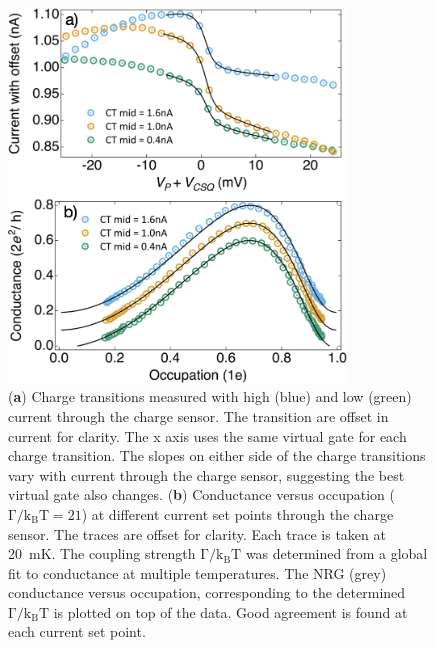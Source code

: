 \begin{figure}[!bht]
 \begin{center}
 \includegraphics[width=0.8\textwidth]{figures/ch3/crop_FiguresMaster.017.png}
 \caption[Conductance vs. Occupation : Varying the current through the charge sensor]{\label{fig:ch3/cond_occ_QPC_vs_ct} 
 (\textbf{a}) Charge transitions measured with high (blue) and low (green) current through the charge sensor. The transition are offset in current for clarity. The x axis uses the same virtual gate for each charge transition. The slopes on either side of the charge transitions vary with current through the charge sensor, suggesting the best virtual gate also changes. (\textbf{b}) Conductance versus occupation ($\mathrm{\Gamma/k_BT=21}$) at different current set points through the charge sensor. The traces are offset for clarity. Each trace is taken at \qty{20}{mK}. The coupling strength $\mathrm{\Gamma/k_BT}$ was determined from a global fit to conductance at multiple temperatures. The NRG (grey) conductance versus occupation, corresponding to the determined $\mathrm{\Gamma/k_BT}$ is plotted on top of the data. Good agreement is found at each current set point.}
 \end{center}
\end{figure}



